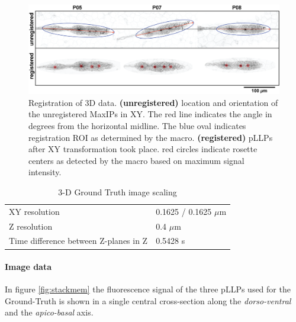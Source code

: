 \documentclass[10pt, b5paper, singlespacinge, twoside]{reedthesis} %
\theoremstyle{definition}
\theoremstyle{definition}
\theoremstyle{definition}
\theoremstyle{remark}
\begin{document}
\begin{figure}

{\centering \includegraphics[width=0.95\linewidth]{figures/materials/ground_truth/registration} 

}

\caption[Registration of 3D data]{Registration of 3D data. \textbf{(unregistered)} location and orientation of the unregistered MaxIPs in XY. The red line indicates the angle in degrees from the horizontal midline. The blue oval indicates registration ROI as determined by the macro. \textbf{(registered)} pLLPs after XY transformation took place. red circles indicate rosette centers as detected by the macro based on maximum signal intensity.}\label{fig:maxraw}
\end{figure}
\begin{table}[!h]

\caption{\label{tab:imgprop}3-D Ground Truth image scaling}
\centering
\begin{tabu} to 
\toprule
{}  XY resolution & 0.1625 / 0.1625 $\mu$m\\
Z resolution & 0.4 $\mu$m\\
  Time difference between Z-planes in Z & 0.5428 s\\
\bottomrule
\end{tabu}
\end{table}
\hypertarget{image-data}{%
\paragraph{Image data}\label{image-data}}

In figure \ref{fig:stackmem} the fluorescence signal of the three pLLPs used for the Ground-Truth is shown in a single central cross-section along the \emph{dorso-ventral} and the \emph{apico-basal} axis.
\end{document}
